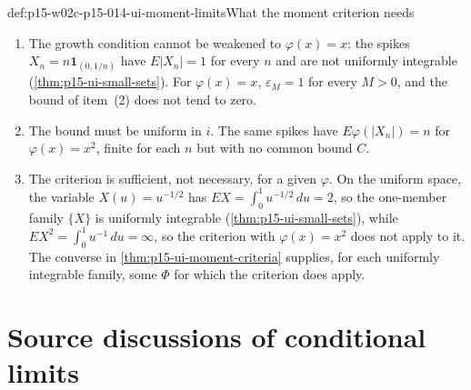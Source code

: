 \begin{hbwarning}{def:p15-w02c-p15-014-ui-moment-limits}{What the moment criterion needs}
\begin{enumerate}
\item The growth condition cannot be weakened to \(\varphi(x)=x\): the
      spikes \(X_n=n\mathbf1_{(0,1/n)}\) have \(E|X_n|=1\) for every
      \(n\) and are not uniformly integrable
      (\cref{thm:p15-ui-small-sets}). For \(\varphi(x)=x\),
      \(\varepsilon_M=1\) for every \(M>0\), and the bound of item~(2) does
      not tend to zero.
\item The bound must be uniform in \(i\). The same spikes have
      \(E\varphi(|X_n|)=n\) for \(\varphi(x)=x^2\), finite for each \(n\)
      but with no common bound \(C\).
\item The criterion is sufficient, not necessary, for a given
      \(\varphi\). On the uniform space, the variable \(X(u)=u^{-1/2}\)
      has \(EX=\int_0^1u^{-1/2}\,du=2\), so the one-member family
      \(\{X\}\) is uniformly integrable (\cref{thm:p15-ui-small-sets}),
      while \(EX^2=\int_0^1u^{-1}\,du=\infty\), so the criterion with
      \(\varphi(x)=x^2\) does not apply to it. The converse in
      \cref{thm:p15-ui-moment-criteria} supplies, for each uniformly
      integrable family, some \(\Phi\) for which the criterion does
      apply.
\end{enumerate}
\end{hbwarning}

\section{Source discussions of conditional limits}
\label{sec:p15-w02c-p15-014-conditional-remarks}

